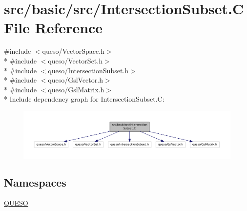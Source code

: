 \hypertarget{_intersection_subset_8_c}{\section{src/basic/src/\-Intersection\-Subset.C File Reference}
\label{_intersection_subset_8_c}
}
{\ttfamily \#include $<$queso/\-Vector\-Space.\-h$>$}\\*
{\ttfamily \#include $<$queso/\-Vector\-Set.\-h$>$}\\*
{\ttfamily \#include $<$queso/\-Intersection\-Subset.\-h$>$}\\*
{\ttfamily \#include $<$queso/\-Gsl\-Vector.\-h$>$}\\*
{\ttfamily \#include $<$queso/\-Gsl\-Matrix.\-h$>$}\\*
Include dependency graph for Intersection\-Subset.\-C\-:
\nopagebreak
\begin{figure}[H]
\begin{center}
\leavevmode
\includegraphics[width=350pt]{_intersection_subset_8_c__incl}
\end{center}
\end{figure}
\subsection*{Namespaces}
\begin{DoxyCompactItemize}
\item 
\hyperlink{namespace_q_u_e_s_o}{Q\-U\-E\-S\-O}
\end{DoxyCompactItemize}
